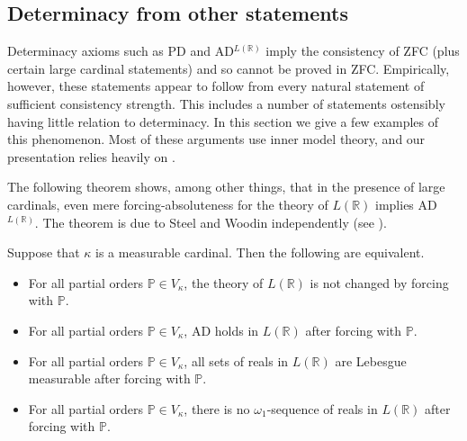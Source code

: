\documentclass{book}%
\def\underTilde#1{{\baselineskip=0pt\vtop{\hbox{$#1$}\hbox{$\sim$}}}{}}
\newcommand{\uTPi}{\underTilde{\Pi}}
\begin{document}





\subsection{Determinacy from other statements}

Determinacy axioms such as PD and AD$^{L(\mathbb{R})}$ imply the consistency of ZFC (plus certain large cardinal statements)
and so cannot be proved in ZFC. Empirically, however, these statements appear to follow from every natural statement of sufficient
consistency strength. This includes a number of statements ostensibly having little relation to determinacy. In this section we give a few examples
of this phenomenon. Most of these arguments use inner model theory, and our presentation relies heavily on \cite{Schimmerling:handbook}.


The following theorem shows, among other things, that in the presence of large cardinals, even mere forcing-absoluteness for the
theory of $L(\mathbb{R})$ implies AD$^{L(\mathbb{R})}$. The theorem is due to Steel and Woodin independently (see
\cite{Steel:2002}).

\begin{theorem} Suppose that $\kappa$ is a measurable cardinal. Then
the following are equivalent.
\begin{itemize}
\item For all partial orders $\mathbb{P} \in V_{\kappa}$, the theory
of $L(\mathbb{R})$ is not changed by forcing with $\mathbb{P}$.
\item For all partial orders $\mathbb{P} \in V_{\kappa}$, {\rm AD} holds in $L(\mathbb{R})$
after forcing with $\mathbb{P}$.
\item For all partial orders
$\mathbb{P} \in V_{\kappa}$, all sets of reals in $L(\mathbb{R})$
are Lebesgue measurable after forcing with $\mathbb{P}$.
\item For all partial orders
$\mathbb{P} \in V_{\kappa}$, there is no $\omega_{1}$-sequence of
reals in $L(\mathbb{R})$ after forcing with $\mathbb{P}$.
\end{itemize}
\end{theorem}
\end{document}
